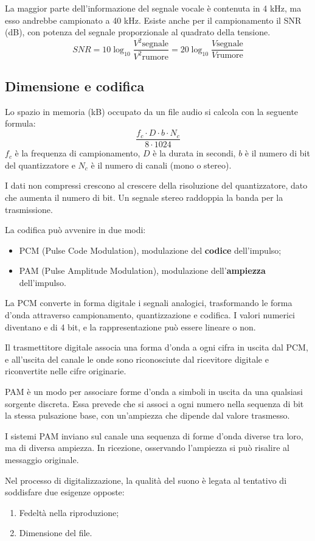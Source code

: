 La maggior parte dell'informazione del segnale vocale è contenuta in 4 kHz, ma esso andrebbe campionato a 40 kHz. Esiste anche per il campionamento il SNR (dB), con potenza del segnale proporzionale al quadrato della tensione.
$$SNR = 10\log_{10} \frac{V^2\text{segnale}}{V^2\text{rumore}} = 20\log_{10} \frac{V\text{segnale}}{V\text{rumore}}$$

\subsection{Dimensione e codifica}
Lo spazio in memoria (kB) occupato da un file audio si calcola con la seguente formula:
$$\frac{f_c \cdot D \cdot b \cdot N_c}{8 \cdot 1024}$$
$f_c$ è la frequenza di campionamento, $D$ è la durata in secondi, $b$ è il numero di bit del quantizzatore e $N_c$ è il numero di canali (mono o stereo).

I dati non compressi crescono al crescere della risoluzione del quantizzatore, dato che aumenta il numero di bit. Un segnale stereo raddoppia la banda per la trasmissione. 

La codifica può avvenire in due modi:
\begin{itemize}
	\item PCM (Pulse Code Modulation), modulazione del \textbf{codice} dell'impulso;
	\item PAM (Pulse Amplitude Modulation), modulazione dell'\textbf{ampiezza} dell'impulso.
\end{itemize}

La PCM converte in forma digitale i segnali analogici, trasformando le forma d'onda attraverso campionamento, quantizzazione e codifica. I valori numerici diventano e di 4 bit, e la rappresentazione può essere lineare o non.

Il trasmettitore digitale associa una forma d'onda a ogni cifra in uscita dal PCM, e all'uscita del canale le onde sono riconosciute dal ricevitore digitale e riconvertite nelle cifre originarie.

PAM è un modo per associare forme d'onda a simboli in uscita da una qualsiasi sorgente discreta. Essa prevede che si associ a ogni numero nella sequenza di bit la stessa pulsazione base, con un'ampiezza che dipende dal valore trasmesso.

I sistemi PAM inviano sul canale una sequenza di forme d'onda diverse tra loro, ma di diversa ampiezza. In ricezione, osservando l'ampiezza si può risalire al messaggio originale.

Nel processo di digitalizzazione, la qualità del suono è legata al tentativo di soddisfare due esigenze opposte:
\begin{enumerate}
	\item Fedeltà nella riproduzione;
	\item Dimensione del file.
\end{enumerate}

